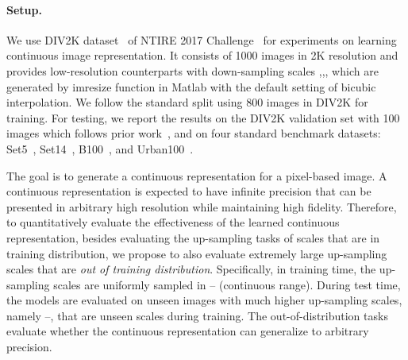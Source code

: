 \documentclass[final]{cvpr}
\begin{document}
\paragraph{Setup.}
We use DIV2K dataset~\cite{agustsson2017ntire} of NTIRE 2017 Challenge~\cite{timofte2017ntire} for experiments on learning continuous image representation. It consists of 1000 images in 2K resolution and provides low-resolution counterparts with down-sampling scales ,,, which are generated by imresize function in Matlab with the default setting of bicubic interpolation. We follow the standard split using 800 images in DIV2K for training. For testing, we report the results on the DIV2K validation set with 100 images which follows prior work~\cite{lim2017enhanced}, and on four standard benchmark datasets: Set5~\cite{bevilacqua2012low}, Set14~\cite{zeyde2010single}, B100~\cite{martin2001database}, and Urban100~\cite{huang2015single}.

The goal is to generate a continuous representation for a pixel-based image. A continuous representation is expected to have infinite precision that can be presented in arbitrary high resolution while maintaining high fidelity. Therefore, to quantitatively evaluate the effectiveness of the learned continuous representation, besides evaluating the up-sampling tasks of scales that are in training distribution, we propose to also evaluate extremely large up-sampling scales that are \textit{out of training distribution}. Specifically, in training time, the up-sampling scales are uniformly sampled in -- (continuous range). During test time, the models are evaluated on unseen images with much higher up-sampling scales, namely --, that are unseen scales during training. The out-of-distribution tasks evaluate whether the continuous representation can generalize to arbitrary precision.
\end{document}
